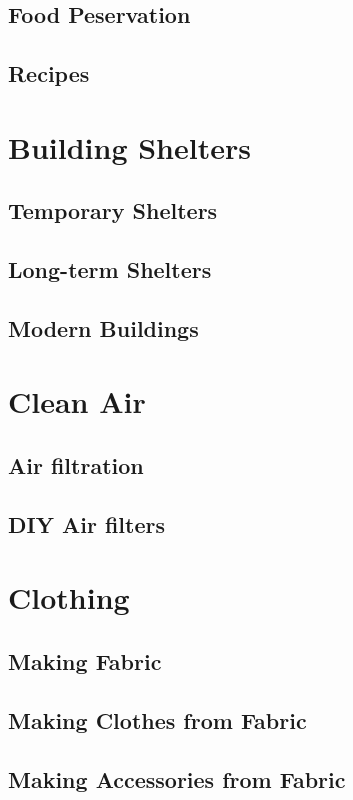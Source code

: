 \documentclass[ebook,12pt,oneside,openany]{memoir}
\begin{document}
\section{Food Peservation}
\section{Recipes}




\chapter{Building Shelters}
\section{Temporary Shelters}
\section{Long-term Shelters}
\section{Modern Buildings}





\chapter{Clean Air}
\section{Air filtration}
\section{DIY Air filters}






\chapter{Clothing}
\section{Making Fabric}
\section{Making Clothes from Fabric}
\section{Making Accessories from Fabric}
\end{document}
